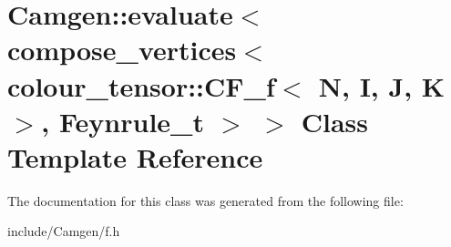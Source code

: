 \hypertarget{a00157}{\section{Camgen\-:\-:evaluate$<$ compose\-\_\-vertices$<$ colour\-\_\-tensor\-:\-:C\-F\-\_\-f$<$ N, I, J, K $>$, Feynrule\-\_\-t $>$ $>$ Class Template Reference}
\label{a00157}
}


The documentation for this class was generated from the following file\-:\begin{DoxyCompactItemize}
\item 
include/\-Camgen/f.\-h\end{DoxyCompactItemize}
